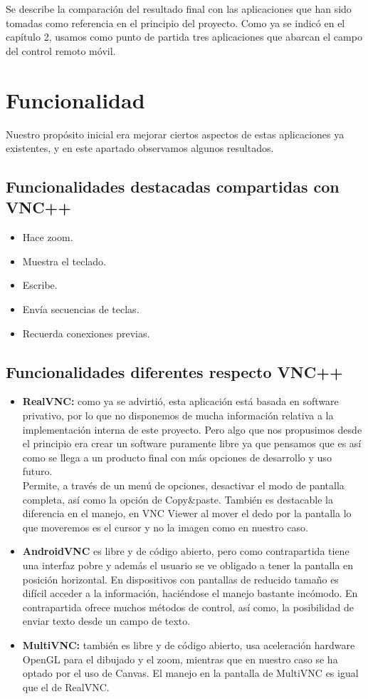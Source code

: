 Se describe la comparación del resultado final con las aplicaciones que han sido tomadas como referencia en el principio del proyecto. Como ya se indicó en el capítulo 2, usamos como punto de partida tres aplicaciones que abarcan el campo del control remoto móvil.

\section{Funcionalidad}

Nuestro propósito inicial era mejorar ciertos aspectos de estas aplicaciones ya existentes, y en este apartado observamos algunos resultados.

\subsection{Funcionalidades destacadas compartidas con VNC++}
\begin{itemize}
\item Hace zoom.
\item Muestra el teclado.
\item Escribe.
\item Envía secuencias de teclas.
\item Recuerda conexiones previas.
\end{itemize}
\subsection{Funcionalidades diferentes respecto VNC++}
\begin{itemize}
\item \textbf{RealVNC:} como ya se advirtió, esta aplicación está basada en software privativo, por lo que no disponemos de mucha información relativa a la implementación interna de este proyecto. Pero algo que nos propusimos desde el principio era crear un software puramente libre ya que pensamos que es así como se llega a un producto final con más opciones de desarrollo y uso futuro.\\

Permite, a través de un menú de opciones, desactivar el modo de pantalla completa, así como la opción de Copy\&paste. También es destacable la diferencia en el manejo, en VNC Viewer al mover el dedo por la pantalla lo que moveremos es el cursor y no la imagen como en nuestro caso.
\item \textbf{AndroidVNC} es libre y de código abierto, pero como contrapartida tiene una interfaz pobre y además el usuario se ve obligado a tener la pantalla en posición horizontal. En dispositivos con pantallas de reducido tamaño es difícil acceder a la información, haciéndose el manejo bastante incómodo. En contrapartida ofrece muchos métodos de control, así como, la posibilidad de enviar texto desde un campo de texto.
\item \textbf{MultiVNC:} también es libre y de código abierto, usa aceleración hardware OpenGL para el dibujado y el zoom, mientras que en nuestro caso se ha optado por el uso de Canvas. El manejo en la pantalla de MultiVNC es igual que el de RealVNC.
\end{itemize}
